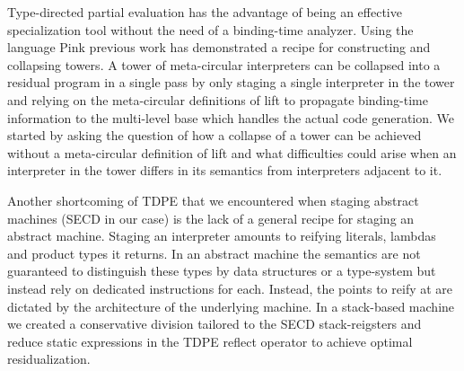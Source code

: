 \documentclass[a4paper,12pt,twoside,openright]{report}
\theoremstyle{definition}
\begin{document}
Type-directed partial evaluation has the advantage of being an effective specialization tool without the need of a binding-time analyzer. Using the language Pink previous work has demonstrated a recipe for constructing and collapsing towers. A tower of meta-circular interpreters can be collapsed into a residual program in a single pass by only staging a single interpreter in the tower and relying on the meta-circular definitions of lift to propagate binding-time information to the multi-level base which handles the actual code generation. We started by asking the question of how a collapse of a tower can be achieved without a meta-circular definition of lift and what difficulties could arise when an interpreter in the tower differs in its semantics from interpreters adjacent to it.

Another shortcoming of TDPE that we encountered when staging abstract machines (SECD in our case) is the lack of a general recipe for staging an abstract machine. Staging an interpreter amounts to reifying literals, lambdas and product types it returns. In an abstract machine the semantics are not guaranteed to distinguish these types by data structures or a type-system but instead rely on dedicated instructions for each. Instead, the points to reify at are dictated by the architecture of the underlying machine. In a stack-based machine we created a conservative division tailored to the SECD stack-reigsters and reduce static expressions in the TDPE reflect operator to achieve optimal residualization.
    
\end{document}
